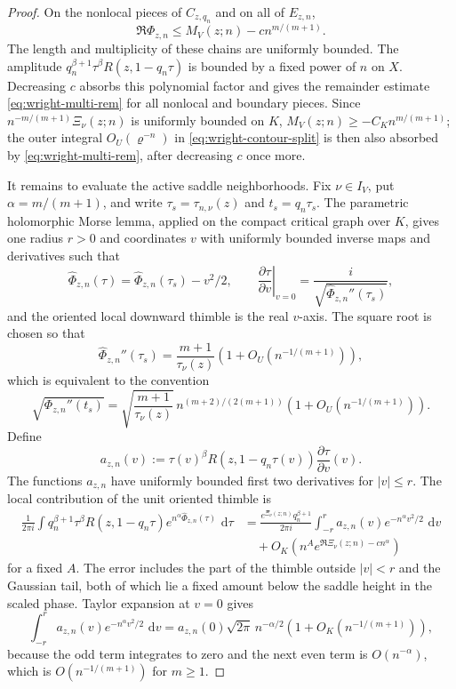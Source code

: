 \documentclass[10pt,a4paper]{amsart}
\newcommand{\dd}{\,\mathrm d}
\begin{document}
\begin{proof}
On the nonlocal pieces of $C_{z,q_n}$ and on all of $E_{z,n}$,
$$\Re\Phi_{z,n}\le M_V(z;n)-c n^{m/(m+1)}.$$
The length and multiplicity of these chains are uniformly bounded. The amplitude $q_n^{\beta+1}\tau^\beta R(z,1-q_n\tau)$ is bounded by a fixed power of $n$ on $X$. Decreasing $c$ absorbs this polynomial factor and gives the remainder estimate \eqref{eq:wright-multi-rem} for all nonlocal and boundary pieces. Since $n^{-m/(m+1)}\Xi_\nu(z;n)$ is uniformly bounded on $K$, $M_V(z;n)\ge -C_Kn^{m/(m+1)}$; the outer integral $O_U(\varrho^{-n})$ in \eqref{eq:wright-contour-split} is then also absorbed by \eqref{eq:wright-multi-rem}, after decreasing $c$ once more.

It remains to evaluate the active saddle neighborhoods. Fix $\nu\in I_V$, put $\alpha=m/(m+1)$, and write $\tau_s=\tau_{n,\nu}(z)$ and $t_s=q_n\tau_s$. The parametric holomorphic Morse lemma, applied on the compact critical graph over $K$, gives one radius $r>0$ and coordinates $v$ with uniformly bounded inverse maps and derivatives such that
$$\widehat\Phi_{z,n}(\tau)=\widehat\Phi_{z,n}(\tau_s)-v^2/2,
\qquad
\left.\frac{\partial\tau}{\partial v}\right|_{v=0}=\frac{i}{\sqrt{\widehat\Phi_{z,n}''(\tau_s)}},$$
and the oriented local downward thimble is the real $v$-axis. The square root is chosen so that
$$\widehat\Phi_{z,n}''(\tau_s)=\frac{m+1}{\tau_\nu(z)}\left(1+O_U\!\left(n^{-1/(m+1)}\right)\right),$$
which is equivalent to the convention
$$\sqrt{\Phi_{z,n}''(t_s)}=
\sqrt{\frac{m+1}{\tau_\nu(z)}}\,n^{(m+2)/(2(m+1))}
\left(1+O_U\!\left(n^{-1/(m+1)}\right)\right).$$
Define
$$a_{z,n}(v):=\tau(v)^\beta R(z,1-q_n\tau(v))\frac{\partial\tau}{\partial v}(v).$$
The functions $a_{z,n}$ have uniformly bounded first two derivatives for $|v|\le r$. The local contribution of the unit oriented thimble is
\begin{align*}
\frac{1}{2\pi i}\int q_n^{\beta+1}\tau^\beta R(z,1-q_n\tau)
 e^{n^\alpha\widehat\Phi_{z,n}(\tau)}\,\dd\tau
&=\frac{e^{\Xi_\nu(z;n)}q_n^{\beta+1}}{2\pi i}
\int_{-r}^r a_{z,n}(v)e^{-n^\alpha v^2/2}\,\dd v\\
&\quad +O_K\!\left(n^A e^{\Re\Xi_\nu(z;n)-c n^\alpha}\right)
\end{align*}
for a fixed $A$. The error includes the part of the thimble outside $|v|<r$ and the Gaussian tail, both of which lie a fixed amount below the saddle height in the scaled phase. Taylor expansion at $v=0$ gives
$$\int_{-r}^r a_{z,n}(v)e^{-n^\alpha v^2/2}\,\dd v
=a_{z,n}(0)\sqrt{2\pi}\,n^{-\alpha/2}
\left(1+O_K\!\left(n^{-1/(m+1)}\right)\right),$$
because the odd term integrates to zero and the next even term is $O(n^{-\alpha})$, which is $O(n^{-1/(m+1)})$ for $m\ge1$.


\end{proof}
\end{document}
